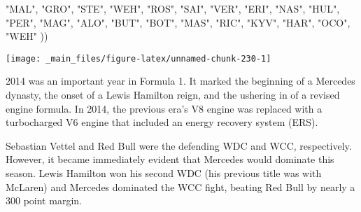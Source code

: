 \documentclass[
]{book}
\newenvironment{Shaded}{\begin{snugshade}}{\end{snugshade}}
\newcommand{\NormalTok}[1]{#1}
\newcommand{\StringTok}[1]{\textcolor[rgb]{0.31,0.60,0.02}{#1}}
\begin{document}
\begin{Shaded}
\begin{Highlighting}[]
                                \StringTok{"MAL"}\NormalTok{, }\StringTok{"GRO"}\NormalTok{,}
                                \StringTok{"STE"}\NormalTok{, }\StringTok{"WEH"}\NormalTok{, }\StringTok{"ROS"}\NormalTok{,}
                                \StringTok{"SAI"}\NormalTok{, }\StringTok{"VER"}\NormalTok{,}
                                \StringTok{"ERI"}\NormalTok{, }\StringTok{"NAS"}\NormalTok{, }
                                \StringTok{"HUL"}\NormalTok{, }\StringTok{"PER"}\NormalTok{,  }
                                \StringTok{"MAG"}\NormalTok{, }\StringTok{"ALO"}\NormalTok{, }\StringTok{"BUT"}\NormalTok{,}
                                \StringTok{"BOT"}\NormalTok{, }\StringTok{"MAS"}\NormalTok{,}
                                \StringTok{"RIC"}\NormalTok{, }\StringTok{"KYV"}\NormalTok{,}
                                \StringTok{"HAR"}\NormalTok{, }\StringTok{"OCO"}\NormalTok{, }\StringTok{"WEH"}
\NormalTok{                                )) }
\end{Highlighting}
\end{Shaded}

\begin{center}\texttt{[image: \_main\_files/figure-latex/unnamed-chunk-230-1]} \end{center}

2014 was an important year in Formula 1. It marked the beginning of a Mercedes dynasty, the onset of a Lewis Hamilton reign, and the ushering in of a revised engine formula. In 2014, the previous era's V8 engine was replaced with a turbocharged V6 engine that included an energy recovery system (ERS).

Sebastian Vettel and Red Bull were the defending WDC and WCC, respectively. However, it became immediately evident that Mercedes would dominate this season. Lewis Hamilton won his second WDC (his previous title was with McLaren) and Mercedes dominated the WCC fight, beating Red Bull by nearly a 300 point margin.
\end{document}
